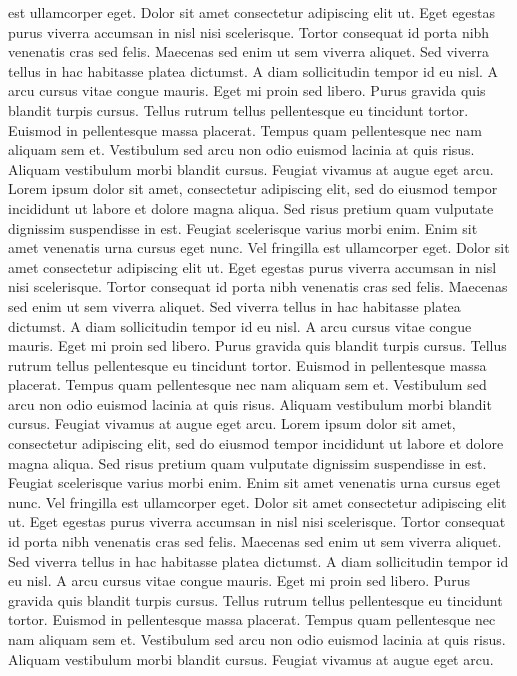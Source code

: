  est ullamcorper eget. Dolor sit amet consectetur adipiscing elit ut.
Eget egestas purus viverra accumsan in nisl nisi scelerisque. Tortor
consequat id porta nibh venenatis cras sed felis. Maecenas sed enim ut
sem viverra aliquet. Sed viverra tellus in hac habitasse platea
dictumst. A diam sollicitudin tempor id eu nisl. A arcu cursus vitae
congue mauris. Eget mi proin sed libero. Purus gravida quis blandit
turpis cursus. Tellus rutrum tellus pellentesque eu tincidunt tortor.
Euismod in pellentesque massa placerat. Tempus quam pellentesque nec nam
 aliquam sem et. Vestibulum sed arcu non odio euismod lacinia at quis
risus. Aliquam vestibulum morbi blandit cursus. Feugiat vivamus at augue
 eget arcu.
Lorem
 ipsum dolor sit amet, consectetur adipiscing elit, sed do eiusmod
tempor incididunt ut labore et dolore magna aliqua. Sed risus pretium
quam vulputate dignissim suspendisse in est. Feugiat scelerisque varius
morbi enim. Enim sit amet venenatis urna cursus eget nunc. Vel fringilla
 est ullamcorper eget. Dolor sit amet consectetur adipiscing elit ut.
Eget egestas purus viverra accumsan in nisl nisi scelerisque. Tortor
consequat id porta nibh venenatis cras sed felis. Maecenas sed enim ut
sem viverra aliquet. Sed viverra tellus in hac habitasse platea
dictumst. A diam sollicitudin tempor id eu nisl. A arcu cursus vitae
congue mauris. Eget mi proin sed libero. Purus gravida quis blandit
turpis cursus. Tellus rutrum tellus pellentesque eu tincidunt tortor.
Euismod in pellentesque massa placerat. Tempus quam pellentesque nec nam
 aliquam sem et. Vestibulum sed arcu non odio euismod lacinia at quis
risus. Aliquam vestibulum morbi blandit cursus. Feugiat vivamus at augue
 eget arcu.
Lorem
 ipsum dolor sit amet, consectetur adipiscing elit, sed do eiusmod
tempor incididunt ut labore et dolore magna aliqua. Sed risus pretium
quam vulputate dignissim suspendisse in est. Feugiat scelerisque varius
morbi enim. Enim sit amet venenatis urna cursus eget nunc. Vel fringilla
 est ullamcorper eget. Dolor sit amet consectetur adipiscing elit ut.
Eget egestas purus viverra accumsan in nisl nisi scelerisque. Tortor
consequat id porta nibh venenatis cras sed felis. Maecenas sed enim ut
sem viverra aliquet. Sed viverra tellus in hac habitasse platea
dictumst. A diam sollicitudin tempor id eu nisl. A arcu cursus vitae
congue mauris. Eget mi proin sed libero. Purus gravida quis blandit
turpis cursus. Tellus rutrum tellus pellentesque eu tincidunt tortor.
Euismod in pellentesque massa placerat. Tempus quam pellentesque nec nam
 aliquam sem et. Vestibulum sed arcu non odio euismod lacinia at quis
risus. Aliquam vestibulum morbi blandit cursus. Feugiat vivamus at augue
 eget arcu.
